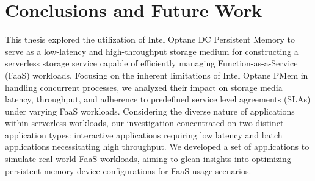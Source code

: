 


\chapter{Conclusions and Future Work}

This thesis explored the utilization of Intel Optane DC Persistent Memory to serve as a low-latency and high-throughput storage medium for constructing a serverless storage service capable of efficiently managing Function-as-a-Service (FaaS) workloads. Focusing on the inherent limitations of Intel Optane PMem in handling concurrent processes, we analyzed their impact on storage media latency, throughput, and adherence to predefined service level agreements (SLAs) under varying FaaS workloads. Considering the diverse nature of applications within serverless workloads, our investigation concentrated on two distinct application types: interactive applications requiring low latency and batch applications necessitating high throughput. We developed a set of applications to simulate real-world FaaS workloads, aiming to glean insights into optimizing persistent memory device configurations for FaaS usage scenarios.

